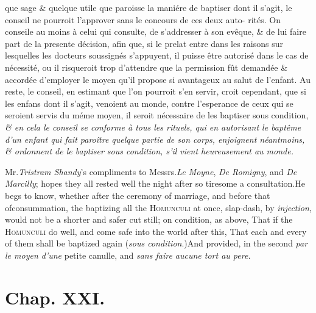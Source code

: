 \documentclass{article}
\begin{document}
que sage \& quelque utile que paroisse la maniére\break
de baptiser dont il s’agit, le conseil ne pourroit\break
l’approver sans le concours de ces deux auto-\break
rités.  On conseile au moins à celui qui consulte,\break
de s’addresser à son evêque, \& de lui faire part\break
de la presente décision, afin que, si le prelat\break
entre dans les raisons sur lesquelles les docteurs\break
soussignés s’appuyent, il puisse être autorisé\break
dans le cas de nécessité, ou il risqueroit trop\break
d'attendre que la permission fût demandée \&\break
accordée d’employer le moyen qu’il propose si\break
avantageux au salut de l’enfant. Au reste,\break
le conseil, en estimant que l’on pourroit s’en\break
servir, croit cependant, que si les enfans dont\break
il s’agit, venoient au monde, contre l’esperance\break
de ceux qui se seroient servis du méme moyen, il seroit nécessaire de
les baptiser \upshape sous condition, \itshape \& en cela le conseil se conforme à
tous les rituels, qui en autorisant le baptême d’un enfant qui fait paroître quelque
partie de son corps, enjoignent néantmoins, \& ordonnent de le baptiser \upshape
sous condition, \itshape s’il vient heureusement au monde.  
\egroup 

\noindent
{}

\medskip

\vbox{\openup 2pt}

\bigskip

Mr.\@ \textit{Tristram Shandy}’s compliments to Messrs.\@ \textit{Le
Moyne}, \textit{De Romigny}, and \textit{De Marcilly}; hopes they all
rested well the night after so tiresome a consultation.\tsk\break  He
begs to know, whether after the ceremony of marriage, and before
that of\pb consummation, the baptizing all the
\textsc{Homunculi} at once, slap-dash, by \textit{injection},
would not be a shorter and safer cut still; on condition, as above,
That if the \textsc{Homunculi} do well, and come safe into
the world after this, That each and every of them shall be baptized
again (\textit{sous condition}.)\tsh  And provided, in the
second\break
{}
\textit{par le moyen d’une} petite canulle, and\break 
\textit{sans faire aucune tort au pere.}

\section{Chap. XXI.}
\end{document}
